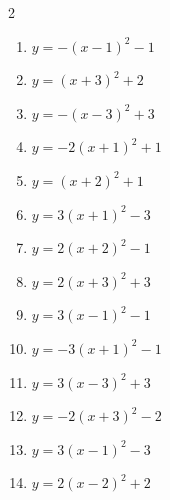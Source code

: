 \documentclass[b5paper,10pt]{ltjsarticle}
\begin{document}
\small
\begin{multicols}{ 2 }
\begin{enumerate}
\setlength{\itemsep}{40 pt}
\item $\displaystyle{} y= -\left( x-1\right)^{2}-1$

\vspace{170pt}\item $\displaystyle{} y= \left( x+3\right)^{2}+2$

\vspace{170pt}\item $\displaystyle{} y= -\left( x-3\right)^{2}+3$

\vspace{170pt}\item $\displaystyle{} y= -2\left( x+1\right)^{2}+1$

\vspace{170pt}\item $\displaystyle{} y= \left( x+2\right)^{2}+1$

\vspace{170pt}\item $\displaystyle{} y= 3\left( x+1\right)^{2}-3$

\vspace{170pt}\item $\displaystyle{} y= 2\left( x+2\right)^{2}-1$

\vspace{170pt}\item $\displaystyle{} y= 2\left( x+3\right)^{2}+3$

\vspace{170pt}\item $\displaystyle{} y= 3\left( x-1\right)^{2}-1$

\vspace{170pt}\item $\displaystyle{} y= -3\left( x+1\right)^{2}-1$

\vspace{170pt}\item $\displaystyle{} y= 3\left( x-3\right)^{2}+3$

\vspace{170pt}\item $\displaystyle{} y= -2\left( x+3\right)^{2}-2$

\vspace{170pt}\item $\displaystyle{} y= 3\left( x-1\right)^{2}-3$

\vspace{170pt}\item $\displaystyle{} y= 2\left( x-2\right)^{2}+2$


\end{enumerate}
\end{multicols}
\end{document}
